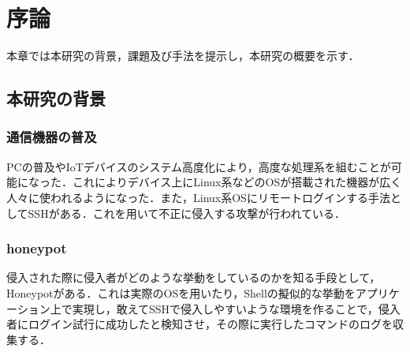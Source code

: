  \chapter{序論}
\label{intr}

本章では本研究の背景，課題及び手法を提示し，本研究の概要を示す．

\section{本研究の背景}

\subsection{通信機器の普及}
\label{intr:back}
PCの普及やIoTデバイスのシステム高度化により，高度な処理系を組むことが可能になった．これによりデバイス上にLinux系などのOSが搭載された機器が広く人々に使われるようになった．また，Linux系OSにリモートログインする手法としてSSHがある．これを用いて不正に侵入する攻撃が行われている．

\subsection{honeypot}
\label{intr:honey}
 侵入された際に侵入者がどのような挙動をしているのかを知る手段として，Honeypotがある．これは実際のOSを用いたり，Shellの擬似的な挙動をアプリケーション上で実現し，敢えてSSHで侵入しやすいような環境を作ることで，侵入者にログイン試行に成功したと検知させ，その際に実行したコマンドのログを収集する．


